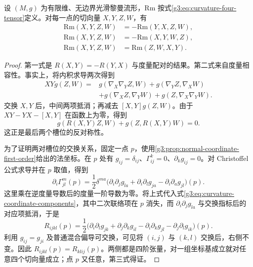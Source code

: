 \begin{proposition}\label{g3:prop:curvature-symmetries}
	设 \((M,g)\) 为有限维、无边界光滑黎曼流形，\(\mathrm{Rm}\) 按式\eqref{g3:eq:curvature-four-tensor}定义。对每一点的切向量 \(X,Y,Z,W\)，有
	\begin{align}
		\mathrm{Rm}(X,Y,Z,W)
			&=-\mathrm{Rm}(Y,X,Z,W),\label{g3:eq:curvature-first-pair-skew}\\
		\mathrm{Rm}(X,Y,Z,W)
			&=-\mathrm{Rm}(X,Y,W,Z),\label{g3:eq:curvature-last-pair-skew}\\
		\mathrm{Rm}(X,Y,Z,W)
			&=\mathrm{Rm}(Z,W,X,Y).\label{g3:eq:curvature-pair-interchange}
	\end{align}
\end{proposition}
\begin{proof}
	第一式是 \(R(X,Y)=-R(Y,X)\) 与度量配对的结果。第二式来自度量相容性。事实上，将内积求导两次得到
	\begin{align*}
		XYg(Z,W)
		={}&g(\nabla_X\nabla_YZ,W)
			+g(\nabla_YZ,\nabla_XW)\\
		&+g(\nabla_XZ,\nabla_YW)
			+g(Z,\nabla_X\nabla_YW).
	\end{align*}
	交换 \(X,Y\) 后，中间两项抵消；再减去 \([X,Y]g(Z,W)\)。由于 \(XY-YX-[X,Y]\) 在函数上为零，得到
	\[
		g(R(X,Y)Z,W)+g(Z,R(X,Y)W)=0.
	\]
	这正是最后两个槽位的反对称性。

	为了证明两对槽位的交换关系，固定一点 \(p\)，使用\cref{g3:prop:normal-coordinate-first-order}给出的法坐标。在 \(p\) 处有 \(g_{ij}=\delta_{ij}\)、\(\Gamma^k_{ij}=0\)、\(\partial_k g_{ij}=0\)。对 Christoffel 公式求导并在 \(p\) 取值，得到
	\[
		\partial_i\Gamma^m_{jl}(p)
		=\frac12\delta^{ma}
		\bigl(\partial_i\partial_jg_{la}
			+\partial_i\partial_lg_{ja}
			-\partial_i\partial_ag_{jl}\bigr)(p).
	\]
	这里乘在逆度量导数后的度量一阶导数为零。将上式代入式\eqref{g3:eq:curvature-coordinate-components}，其中二次联络项在 \(p\) 消失，而 \(\partial_i\partial_jg_{la}\) 与交换指标后的对应项抵消，于是
	\begin{equation}\label{g3:eq:curvature-normal-second-derivatives}
		R_{ijkl}(p)
		=\frac12\bigl(
			\partial_i\partial_lg_{jk}
			+\partial_j\partial_kg_{il}
			-\partial_i\partial_kg_{jl}
			-\partial_j\partial_lg_{ik}
		\bigr)(p).
	\end{equation}
	利用 \(g_{ij}=g_{ji}\) 及普通混合偏导可交换，可见将 \((i,j)\) 与 \((k,l)\) 交换后，右侧不变。因此 \(R_{ijkl}(p)=R_{klij}(p)\)。两侧都是四阶张量，对一组坐标基成立就对任意四个切向量成立；点 \(p\) 又任意，第三式得证。
\end{proof}

